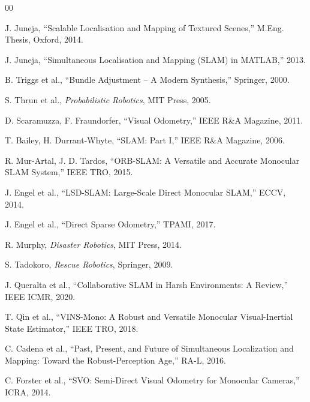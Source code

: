 \documentclass[conference]{IEEEtran}
\begin{document}
\begin{thebibliography}{00}

 J. Juneja, ``Scalable Localisation and Mapping of Textured Scenes,'' M.Eng. Thesis, Oxford, 2014.

 J. Juneja, ``Simultaneous Localisation and Mapping (SLAM) in MATLAB,'' 2013.

 B. Triggs et al., ``Bundle Adjustment – A Modern Synthesis,'' Springer, 2000.

 S. Thrun et al., \textit{Probabilistic Robotics}, MIT Press, 2005.

 D. Scaramuzza, F. Fraundorfer, ``Visual Odometry,'' IEEE R\&A Magazine, 2011.

 T. Bailey, H. Durrant-Whyte, ``SLAM: Part I,'' IEEE R\&A Magazine, 2006.

 R. Mur-Artal, J. D. Tardos, ``ORB-SLAM: A Versatile and Accurate Monocular SLAM System,'' IEEE TRO, 2015.

 J. Engel et al., ``LSD-SLAM: Large-Scale Direct Monocular SLAM,'' ECCV, 2014.

 J. Engel et al., ``Direct Sparse Odometry,'' TPAMI, 2017.

 R. Murphy, \textit{Disaster Robotics}, MIT Press, 2014.

 S. Tadokoro, \textit{Rescue Robotics}, Springer, 2009.

 J. Queralta et al., ``Collaborative SLAM in Harsh Environments: A Review,'' IEEE ICMR, 2020.

 T. Qin et al., ``VINS-Mono: A Robust and Versatile Monocular Visual-Inertial State Estimator,'' IEEE TRO, 2018.

 C. Cadena et al., ``Past, Present, and Future of Simultaneous Localization and Mapping: Toward the Robust-Perception Age,'' RA-L, 2016.

 C. Forster et al., ``SVO: Semi-Direct Visual Odometry for Monocular Cameras,'' ICRA, 2014.

\end{thebibliography}
\end{document}
